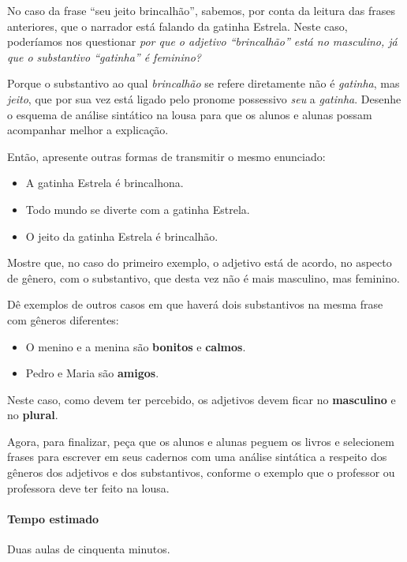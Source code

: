 \documentclass[11pt]{extarticle}
\begin{document}

No caso da frase ``seu jeito brincalhão'', sabemos, por conta da leitura das frases anteriores,
que o narrador está falando da gatinha Estrela. Neste caso, poderíamos
nos questionar \textit{por que o adjetivo ``brincalhão'' está no masculino,
já que o substantivo ``gatinha'' é feminino?}

Porque o substantivo ao qual \textit{brincalhão} se refere diretamente não é \textit{gatinha},
mas \textit{jeito}, que por sua vez está ligado pelo pronome possessivo \textit{seu} 
a \textit{gatinha}. Desenhe o esquema de análise sintático na lousa para que os alunos
e alunas possam acompanhar melhor a explicação.

Então, apresente outras formas de transmitir o mesmo enunciado:

\begin{itemize}
	\item A gatinha Estrela é brincalhona.
	\item Todo mundo se diverte com a gatinha Estrela. 
	\item O jeito da gatinha Estrela é brincalhão.
\end{itemize}

Mostre que, no caso do primeiro exemplo, o adjetivo está de acordo, no aspecto de gênero,
com o substantivo, que desta vez não é mais masculino, mas feminino. 

Dê exemplos de outros casos em que haverá dois substantivos na mesma frase com gêneros diferentes:

\begin{itemize}
	\item O menino e a menina são \textbf{bonitos} e \textbf{calmos}.
	\item Pedro e Maria são \textbf{amigos}.
\end{itemize}

Neste caso, como devem ter percebido, os adjetivos devem ficar no \textbf{masculino} e no \textbf{plural}.

Agora, para finalizar, peça que os alunos e alunas peguem os livros e selecionem
frases para escrever em seus cadernos com uma análise sintática a respeito 
dos gêneros dos adjetivos e dos substantivos, conforme o exemplo que o professor
ou professora deve ter feito na lousa. 

\paragraph{Tempo estimado} Duas aulas de cinquenta minutos.
\end{document}
